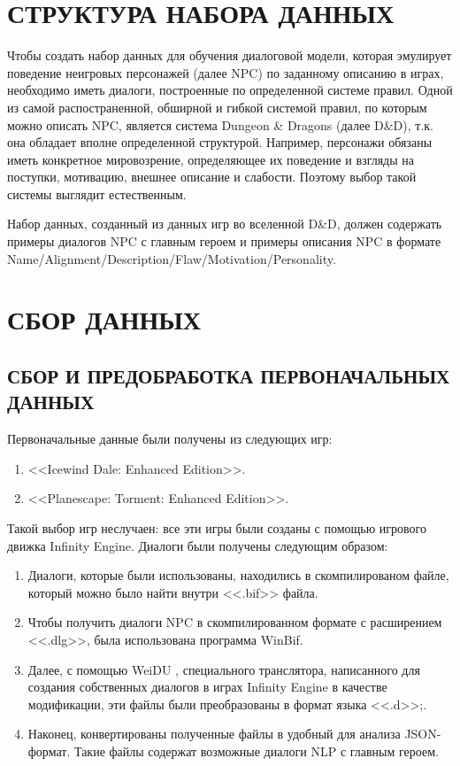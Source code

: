 \section{СТРУКТУРА НАБОРА ДАННЫХ}
Чтобы создать набор данных для обучения диалоговой модели, которая эмулирует поведение  неигровых персонажей (далее NPC) по заданному описанию в играх, необходимо иметь диалоги, построенные по определенной системе правил. Одной из самой распостраненной, обширной и гибкой системой правил, по которым можно описать NPC, является система Dungeon \& Dragons (далее D\&D), т.к. она обладает вполне определенной структурой. Например, персонажи обязаны иметь конкретное мировозрение, определяющее их поведение и взгляды на поступки, мотивацию, внешнее описание и слабости. Поэтому выбор такой системы выглядит естественным. 

Набор данных, созданный из данных игр во вселенной D\&D, должен содержать примеры диалогов NPC с главным героем и примеры описания NPC в формате Name/Alignment/Description/Flaw/Motivation/Personality.

\section{СБОР ДАННЫХ}
\subsection{СБОР И ПРЕДОБРАБОТКА ПЕРВОНАЧАЛЬНЫХ ДАННЫХ}
Первоначальные данные были получены из следующих игр: 
\begin{enumerate}
      \item <<Icewind Dale: Enhanced Edition>>.
      \item <<Planescape: Torment: Enhanced Edition>>.
\end{enumerate}

Такой выбор игр неслучаен: все эти игры были созданы с помощью  игрового движка Infinity Engine. Диалоги были получены следующим образом:
\begin{enumerate}
      \item Диалоги, которые были использованы, находились в скомпилированом файле, который можно было найти внутри <<.bif>> файла.
      \item Чтобы получить диалоги NPC в скомпилированном формате с расширением <<.dlg>>, была использована программа WinBif.
      \item Далее, с помощью WeiDU \cite{weidu-repo}, специального транслятора,
            написанного для создания собственных диалогов в играх Infinity Engine в качестве модификации, эти файлы были преобразованы в формат языка <<.d>>;.
      \item Наконец, конвертированы полученные файлы в удобный для анализа JSON-формат. Такие файлы содержат возможные диалоги NLP с главным героем.
\end{enumerate}


